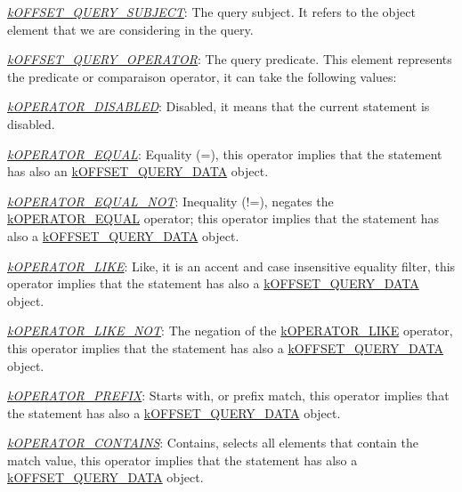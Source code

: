 {\itshape 
\begin{DoxyItemize}
\item {\itshape \hyperlink{}{k\-O\-F\-F\-S\-E\-T\-\_\-\-Q\-U\-E\-R\-Y\-\_\-\-S\-U\-B\-J\-E\-C\-T}}\-: The query subject. It refers to the object element that we are considering in the query. 
\item {\itshape \hyperlink{}{k\-O\-F\-F\-S\-E\-T\-\_\-\-Q\-U\-E\-R\-Y\-\_\-\-O\-P\-E\-R\-A\-T\-O\-R}}\-: The query predicate. This element represents the predicate or comparaison operator, it can take the following values\-: 
\begin{DoxyItemize}
\item {\itshape \hyperlink{}{k\-O\-P\-E\-R\-A\-T\-O\-R\-\_\-\-D\-I\-S\-A\-B\-L\-E\-D}}\-: Disabled, it means that the current statement is disabled. 
\item {\itshape \hyperlink{}{k\-O\-P\-E\-R\-A\-T\-O\-R\-\_\-\-E\-Q\-U\-A\-L}}\-: Equality ({\ttfamily =}), this operator implies that the statement has also an \hyperlink{}{k\-O\-F\-F\-S\-E\-T\-\_\-\-Q\-U\-E\-R\-Y\-\_\-\-D\-A\-T\-A} object. 
\item {\itshape \hyperlink{}{k\-O\-P\-E\-R\-A\-T\-O\-R\-\_\-\-E\-Q\-U\-A\-L\-\_\-\-N\-O\-T}}\-: Inequality ({\ttfamily !=}), negates the \hyperlink{}{k\-O\-P\-E\-R\-A\-T\-O\-R\-\_\-\-E\-Q\-U\-A\-L} operator; this operator implies that the statement has also a \hyperlink{}{k\-O\-F\-F\-S\-E\-T\-\_\-\-Q\-U\-E\-R\-Y\-\_\-\-D\-A\-T\-A} object. 
\item {\itshape \hyperlink{}{k\-O\-P\-E\-R\-A\-T\-O\-R\-\_\-\-L\-I\-K\-E}}\-: Like, it is an accent and case insensitive equality filter, this operator implies that the statement has also a \hyperlink{}{k\-O\-F\-F\-S\-E\-T\-\_\-\-Q\-U\-E\-R\-Y\-\_\-\-D\-A\-T\-A} object. 
\item {\itshape \hyperlink{}{k\-O\-P\-E\-R\-A\-T\-O\-R\-\_\-\-L\-I\-K\-E\-\_\-\-N\-O\-T}}\-: The negation of the \hyperlink{}{k\-O\-P\-E\-R\-A\-T\-O\-R\-\_\-\-L\-I\-K\-E} operator, this operator implies that the statement has also a \hyperlink{}{k\-O\-F\-F\-S\-E\-T\-\_\-\-Q\-U\-E\-R\-Y\-\_\-\-D\-A\-T\-A} object. 
\item {\itshape \hyperlink{}{k\-O\-P\-E\-R\-A\-T\-O\-R\-\_\-\-P\-R\-E\-F\-I\-X}}\-: Starts with, or prefix match, this operator implies that the statement has also a \hyperlink{}{k\-O\-F\-F\-S\-E\-T\-\_\-\-Q\-U\-E\-R\-Y\-\_\-\-D\-A\-T\-A} object. 
\item {\itshape \hyperlink{}{k\-O\-P\-E\-R\-A\-T\-O\-R\-\_\-\-C\-O\-N\-T\-A\-I\-N\-S}}\-: Contains, selects all elements that contain the match value, this operator implies that the statement has also a \hyperlink{}{k\-O\-F\-F\-S\-E\-T\-\_\-\-Q\-U\-E\-R\-Y\-\_\-\-D\-A\-T\-A} object. 

\end{DoxyItemize}
\end{DoxyItemize}}
